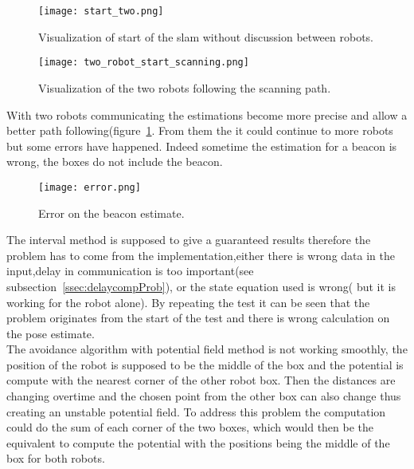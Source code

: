 \begin{figure}[H]
\centering
\begin{minipage}[b]{0.4\textwidth}
\texttt{[image: start\_two.png]}
\caption{Visualization of start of the slam without discussion between robots.}
\label{fig:twoRobResDeb}
\end{minipage}
\begin{minipage}[b]{0.4\textwidth}
\texttt{[image: two\_robot\_start\_scanning.png]}
\caption{Visualization of the two robots following the scanning path.}
\label{fig:twoRobResEnd}
\end{minipage}
\end{figure}

With two robots communicating the estimations become more precise and allow a better path following(figure~\ref{fig:twoRobResEnd}.
From them the it could continue to more robots but some errors have happened. Indeed sometime the estimation for a beacon is wrong, the boxes do not include the beacon.

\begin{figure}[H]
\centering
\texttt{[image: error.png]}
\caption{Error on the beacon estimate.}
\label{fig:errorEst}
\end{figure}

The interval method is supposed to give a guaranteed results therefore the problem has to come from the implementation,either there is wrong data in the input,delay in communication is too important(see subsection~\ref{ssec:delaycompProb}), or the state equation used is wrong( but it is working for the robot alone).
By repeating the test it can be seen that the problem originates from the start of the test and there is wrong calculation on the pose estimate.\\

The avoidance algorithm with potential field method is not working smoothly, the position of the robot is supposed to be the middle of the box and the potential is compute with the nearest corner of the other robot box. Then the distances are changing overtime and the chosen point from the other box can also change thus  creating an unstable potential field. To address this problem the computation could do the sum of each corner of the two boxes, which would then be the equivalent to compute the potential with the positions being the middle of the box for both robots.